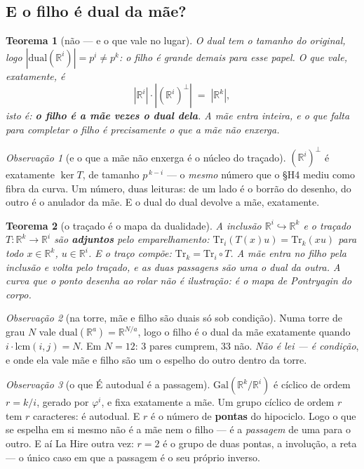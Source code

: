 \documentclass[11pt]{article}
\newcommand{\R}{\mathbb R}
\theoremstyle{plain}
\newtheorem{teorema}{Teorema}
\theoremstyle{remark}
\newtheorem{obs}{Observação}
\begin{document}
\subsection*{E o filho é dual da mãe?}

\begin{teorema}[não --- e o que vale no lugar]
O dual tem o tamanho do original, logo $|\mathrm{dual}(\R^i)|=p^i\ne p^k$: o filho é grande demais
para esse papel. O que vale, exatamente, é
\[
  |\R^i|\cdot|(\R^i)^{\perp}| \;=\; |\R^k| ,
\]
isto é: \textbf{o filho é a mãe vezes o dual dela}. A mãe entra inteira, e o que falta para completar
o filho é precisamente o que a mãe não enxerga.
\end{teorema}

\begin{obs}[e o que a mãe não enxerga é o núcleo do traçado]
$(\R^i)^{\perp}$ é exatamente $\ker T$, de tamanho $p^{\,k-i}$ --- o \emph{mesmo} número que o
\S H4 mediu como fibra da curva. Um número, duas leituras: de um lado é o borrão do desenho, do outro
é o anulador da mãe. E o dual do dual devolve a mãe, exatamente.
\end{obs}

\begin{teorema}[o traçado é o mapa da dualidade]
A inclusão $\R^i\hookrightarrow\R^k$ e o traçado $T:\R^k\to\R^i$ são \textbf{adjuntos} pelo
emparelhamento: $\mathrm{Tr}_i(T(x)u)=\mathrm{Tr}_k(xu)$ para todo $x\in\R^k$, $u\in\R^i$. E o traço
compõe: $\mathrm{Tr}_k=\mathrm{Tr}_i\circ T$. A mãe \emph{entra} no filho pela inclusão e \emph{volta}
pelo traçado, e as duas passagens são uma o dual da outra. \emph{A curva que o ponto desenha ao rolar
não é ilustração: é o mapa de Pontryagin do corpo.}
\end{teorema}

\begin{obs}[na torre, mãe e filho são duais só sob condição]
Numa torre de grau $N$ vale $\mathrm{dual}(\R^a)=\R^{N/a}$, logo o filho é o dual da mãe exatamente
quando $i\cdot\mathrm{lcm}(i,j)=N$. Em $N=12$: $3$ pares cumprem, $33$ não. \emph{Não é lei --- é
condição}, e onde ela vale mãe e filho são um o espelho do outro dentro da torre.
\end{obs}

\begin{obs}[o que É autodual é a passagem]
$\mathrm{Gal}(\R^k/\R^i)$ é cíclico de ordem $r=k/i$, gerado por $\varphi^i$, e fixa exatamente a mãe.
Um grupo cíclico de ordem $r$ tem $r$ caracteres: é autodual. E $r$ é o número de \textbf{pontas} do
hipociclo. Logo o que se espelha em si mesmo não é a mãe nem o filho --- é a \emph{passagem} de uma
para o outro. E aí La Hire outra vez: $r=2$ é o grupo de duas pontas, a involução, a reta --- o único
caso em que a passagem é o seu próprio inverso.
\end{obs}
\end{document}

